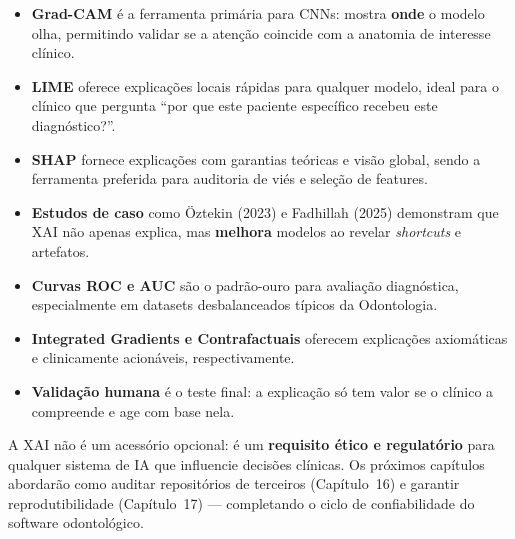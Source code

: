 \begin{itemize}
  \item \textbf{Grad-CAM} é a ferramenta primária para CNNs: mostra
    \textbf{onde} o modelo olha, permitindo validar se a atenção coincide
    com a anatomia de interesse clínico.

  \item \textbf{LIME} oferece explicações locais rápidas para qualquer
    modelo, ideal para o clínico que pergunta ``por que este paciente
    específico recebeu este diagnóstico?''.

  \item \textbf{SHAP} fornece explicações com garantias teóricas e visão
    global, sendo a ferramenta preferida para auditoria de viés e seleção
    de features.

  \item \textbf{Estudos de caso} como Öztekin (2023) e Fadhillah (2025)
    demonstram que XAI não apenas explica, mas \textbf{melhora} modelos
    ao revelar \textit{shortcuts} e artefatos.

  \item \textbf{Curvas ROC e AUC} são o padrão-ouro para avaliação
    diagnóstica, especialmente em datasets desbalanceados típicos da
    Odontologia.

  \item \textbf{Integrated Gradients e Contrafactuais} oferecem explicações
    axiomáticas e clinicamente acionáveis, respectivamente.

  \item \textbf{Validação humana} é o teste final: a explicação só tem
    valor se o clínico a compreende e age com base nela.
\end{itemize}

A XAI não é um acessório opcional: é um \textbf{requisito ético e
regulatório} para qualquer sistema de IA que influencie decisões
clínicas. Os próximos capítulos abordarão como auditar repositórios
de terceiros (Capítulo~16) e garantir reprodutibilidade (Capítulo~17) —
completando o ciclo de confiabilidade do software odontológico.
